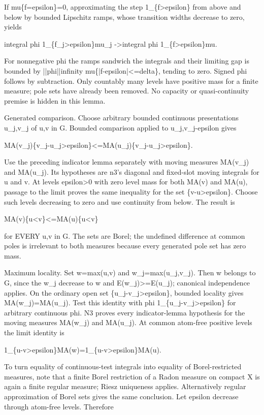 \documentclass[11pt]{article}
\begin{document}
If mu\{f=epsilon\}=0, approximating the step 1\_\{f>epsilon\} from above and below by bounded Lipschitz ramps, whose transition widths decrease to zero, yields

integral phi 1\_\{f\_j>epsilon\}mu\_j ->integral phi 1\_\{f>epsilon\}mu.

For nonnegative phi the ramps sandwich the integrals and their limiting gap is bounded by ||phi||infinity mu\{|f-epsilon|<=delta\}, tending to zero. Signed phi follows by subtraction. Only countably many levels have positive mass for a finite measure; pole sets have already been removed. No capacity or quasi-continuity premise is hidden in this lemma.

Generated comparison. Choose arbitrary bounded continuous presentations u\_j,v\_j of u,v in G. Bounded comparison applied to u\_j,v\_j-epsilon gives

MA(v\_j)\{v\_j-u\_j>epsilon\}<=MA(u\_j)\{v\_j-u\_j>epsilon\}.

Use the preceding indicator lemma separately with moving measures MA(v\_j) and MA(u\_j). Its hypotheses are n3's diagonal and fixed-slot moving integrals for u and v. At levels epsilon>0 with zero level mass for both MA(v) and MA(u), passage to the limit proves the same inequality for the set \{v-u>epsilon\}. Choose such levels decreasing to zero and use continuity from below. The result is

MA(v)\{u<v\}<=MA(u)\{u<v\}

for EVERY u,v in G. The sets are Borel; the undefined difference at common poles is irrelevant to both measures because every generated pole set has zero mass.

Maximum locality. Set w=max(u,v) and w\_j=max(u\_j,v\_j). Then w belongs to G, since the w\_j decrease to w and E(w\_j)>=E(u\_j); canonical independence applies. On the ordinary open set \{u\_j-v\_j>epsilon\}, bounded locality gives MA(w\_j)=MA(u\_j). Test this identity with phi 1\_\{u\_j-v\_j>epsilon\} for arbitrary continuous phi. N3 proves every indicator-lemma hypothesis for the moving measures MA(w\_j) and MA(u\_j). At common atom-free positive levels the limit identity is

1\_\{u-v>epsilon\}MA(w)=1\_\{u-v>epsilon\}MA(u).

To turn equality of continuous-test integrals into equality of Borel-restricted measures, note that a finite Borel restriction of a Radon measure on compact X is again a finite regular measure; Riesz uniqueness applies. Alternatively regular approximation of Borel sets gives the same conclusion. Let epsilon decrease through atom-free levels. Therefore
\end{document}
